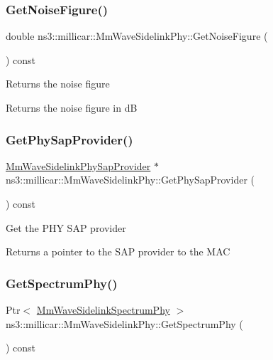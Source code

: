 \subsubsection{\texorpdfstring{Get\+Noise\+Figure()}{GetNoiseFigure()}}
{\footnotesize\ttfamily double ns3\+::millicar\+::\+Mm\+Wave\+Sidelink\+Phy\+::\+Get\+Noise\+Figure (\begin{DoxyParamCaption}{ }\end{DoxyParamCaption}) const}

Returns the noise figure \begin{DoxyReturn}{Returns}
the noise figure in dB 
\end{DoxyReturn}
\mbox{\label{classns3_1_1millicar_1_1MmWaveSidelinkPhy_ab8df82d08b89cfa181a548ca935409bf}} 
\subsubsection{\texorpdfstring{Get\+Phy\+Sap\+Provider()}{GetPhySapProvider()}}
{\footnotesize\ttfamily \hyperlink{classns3_1_1millicar_1_1MmWaveSidelinkPhySapProvider}{Mm\+Wave\+Sidelink\+Phy\+Sap\+Provider} $\ast$ ns3\+::millicar\+::\+Mm\+Wave\+Sidelink\+Phy\+::\+Get\+Phy\+Sap\+Provider (\begin{DoxyParamCaption}{ }\end{DoxyParamCaption}) const}

Get the P\+HY S\+AP provider \begin{DoxyReturn}{Returns}
a pointer to the S\+AP provider to the M\+AC 
\end{DoxyReturn}
\mbox{\label{classns3_1_1millicar_1_1MmWaveSidelinkPhy_ad351ad92c46d2250c1848cc6f45d3de9}} 
\subsubsection{\texorpdfstring{Get\+Spectrum\+Phy()}{GetSpectrumPhy()}}
{\footnotesize\ttfamily Ptr$<$ \hyperlink{classns3_1_1millicar_1_1MmWaveSidelinkSpectrumPhy}{Mm\+Wave\+Sidelink\+Spectrum\+Phy} $>$ ns3\+::millicar\+::\+Mm\+Wave\+Sidelink\+Phy\+::\+Get\+Spectrum\+Phy (\begin{DoxyParamCaption}{ }\end{DoxyParamCaption}) const}

